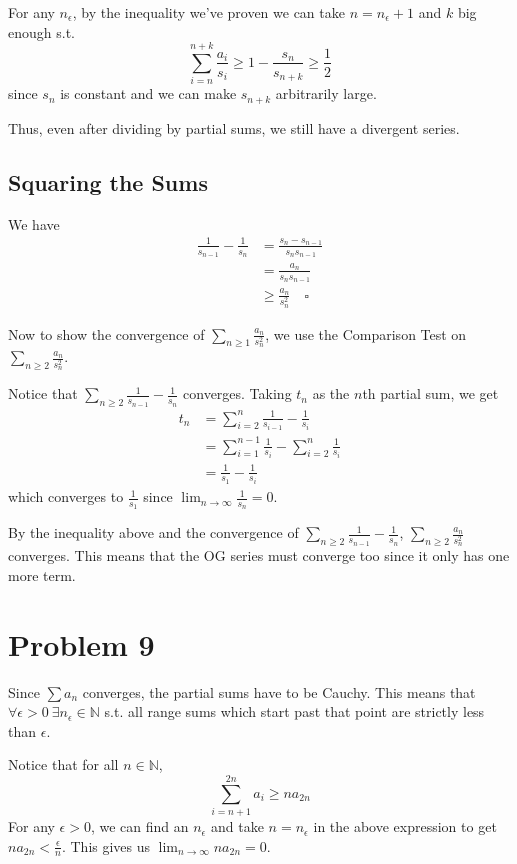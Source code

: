\documentclass[12pt]{article}
\newcommand{\N}{\mathbb{N}}
\begin{document}
For any $n_\epsilon$, by the inequality we've proven we
can take $n=n_\epsilon+1$ and $k$ big enough s.t.
\[\sum_{i=n}^{n+k} \frac{a_i}{s_i} \ge 1-\frac{s_n}{s_{n+k}} \ge \frac{1}{2}\]
since $s_n$ is constant and we can make $s_{n+k}$ arbitrarily large.

Thus, even after dividing by partial sums, we still have a divergent series.

\subsection{Squaring the Sums}

We have
\begin{align*}
  \frac{1}{s_{n-1}} - \frac{1}{s_n}
   & = \frac{s_n-s_{n-1}}{s_ns_{n-1}}  \\
   & = \frac{a_n}{s_ns_{n-1}}          \\
   & \ge \frac{a_n}{s_n^2}\quad\square
\end{align*}

Now to show the convergence of $\sum_{n \ge 1} \frac{a_n}{s_n^2}$, we use the Comparison Test on $\sum_{n \ge 2} \frac{a_n}{s_n^2}$.

Notice that $\sum_{n \ge 2} \frac{1}{s_{n-1}}-\frac{1}{s_n}$ converges.
Taking $t_n$ as the $n$th partial sum, we get
\begin{align*}
  t_n
   & =\sum_{i=2}^{n} \frac{1}{s_{i-1}}-\frac{1}{s_i}                \\
   & =\sum_{i=1}^{n-1} \frac{1}{s_i} - \sum_{i=2}^{n} \frac{1}{s_i} \\
   & =\frac{1}{s_1} - \frac{1}{s_i}
\end{align*}
which converges to $\frac{1}{s_1}$ since $\lim_{n \to \infty} \frac{1}{s_n}=0$.

By the inequality above and the convergence of $\sum_{n \ge 2} \frac{1}{s_{n-1}}-\frac{1}{s_n}$,
$\sum_{n \ge 2} \frac{a_n}{s_n^2}$ converges.
This means that the OG series must converge too since it only has one more term.

\section{Problem 9}

Since $\sum a_n$ converges, the partial sums have to be Cauchy.
This means that $\forall \epsilon > 0\ \exists n_\epsilon \in \N$
s.t. all range sums which start past that point are strictly less than $\epsilon$.

Notice that for all $n \in \N$,
\[\sum_{i=n+1}^{2n} a_i \ge na_{2n}\]
For any $\epsilon > 0$, we can find an $n_\epsilon$ and take $n=n_\epsilon$
in the above expression to get $na_{2n} < \frac{\epsilon}{n}$.
This gives us $\lim_{n \to \infty} na_{2n}=0$.
\end{document}
